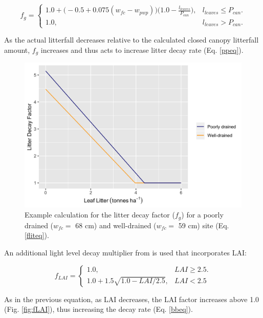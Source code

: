 \documentclass[a4paper, 12pt] {report}
\begin{document}
\begin{equation} \label{fliteq}
f_{g} = \begin{cases}
1.0 + \Big(-0.5 + 0.075(w_{fc} - w_{pwp})\Big)\Big(1.0 - \frac{l_{leaves}}{P_{can}}\Big), & \text{$l_{leaves} \leq P_{can}$}. \\
1.0, & \text{$l_{leaves} > P_{can}$}.
\end{cases}
\end{equation}

As the actual litterfall decreases relative to the calculated closed canopy litterfall amount, $f_g$ increases and thus acts to increase litter decay rate (Eq. \ref{ppeq}).

\begin{figure}
  \includegraphics[width=0.9\linewidth]{Figures/Flit.png}
  \caption{Example calculation for the litter decay factor ($f_g$) for a poorly drained ($w_{fc} =$ 68 cm) and well-drained ($w_{fc} =$ 59 cm) site (Eq. \ref{fliteq}).}
  \label{fig:flit}
\end{figure}

An additional light level decay multiplier from  is used that incorporates LAI:

\begin{equation} \label{flai}
f_{LAI} = \begin{cases}
1.0, & \text{$LAI \ge 2.5$}. \\
1.0 + 1.5\sqrt{1.0 - LAI/2.5}, & \text{$LAI < 2.5$}
\end{cases}
\end{equation}

As in the previous equation, as LAI decreases, the LAI factor increases above 1.0 (Fig. \ref{fig:fLAI}), thus increasing the decay rate (Eq. \ref{bbeq}).
\end{document}

